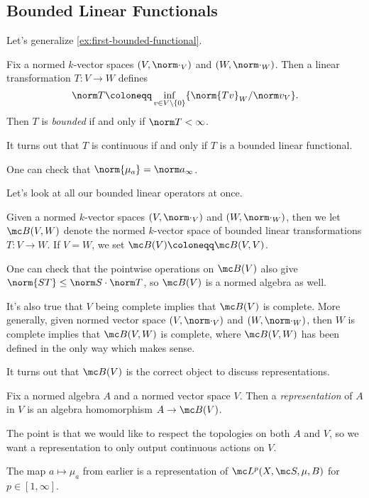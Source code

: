 \documentclass[../notes.tex]{subfiles}
\begin{document}
\subsection{Bounded Linear Functionals}
Let's generalize \autoref{ex:first-bounded-functional}.
\begin{definition}[Bounded]
	Fix a normed $k$-vector spaces $(V,\norm\cdot_V)$ and $(W,\norm\cdot_W)$. Then a linear transformation $T\colon V\to W$ defines
	\[\norm T\coloneqq\inf_{v\in V\setminus\{0\}}\{\norm{Tv}_W/\norm v_V\}.\]
	Then $T$ is \textit{bounded} if and only if $\norm T<\infty$.
\end{definition}
\begin{remark}
	It turns out that $T$ is continuous if and only if $T$ is a bounded linear functional.
\end{remark}
\begin{example}
	One can check that $\norm{\mu_a}=\norm a_\infty$.
\end{example}
Let's look at all our bounded linear operators at once.
\begin{notation}
	Given a normed $k$-vector spaces $(V,\norm\cdot_V)$ and $(W,\norm\cdot_W)$, then we let $\mc B(V,W)$ denote the normed $k$-vector space of bounded linear transformations $T\colon V\to W$. If $V=W$, we set $\mc B(V)\coloneqq\mc B(V,V)$.
\end{notation}
\begin{remark}
	One can check that the pointwise operations on $\mc B(V)$ also give $\norm{ST}\le\norm S\cdot\norm T$, so $\mc B(V)$ is a normed algebra as well.
\end{remark}
\begin{remark}
	It's also true that $V$ being complete implies that $\mc B(V)$ is complete. More generally, given normed vector space $(V,\norm\cdot_V)$ and $(W,\norm\cdot_W)$, then $W$ is complete implies that $\mc B(V,W)$ is complete, where $\mc B(V,W)$ has been defined in the only way which makes sense.
\end{remark}
It turns out that $\mc B(V)$ is the correct object to discuss representations.
\begin{definition}
	Fix a normed algebra $A$ and a normed vector space $V$. Then a \textit{representation} of $A$ in $V$ is an algebra homomorphism $A\to\mc B(V)$.
\end{definition}
The point is that we would like to respect the topologies on both $A$ and $V$, so we want a representation to only output continuous actions on $V$.
\begin{example}
	The map $a\mapsto\mu_a$ from earlier is a representation of $\mc L^p(X,\mc S,\mu,B)$ for $p\in[1,\infty]$.
\end{example}
\end{document}

